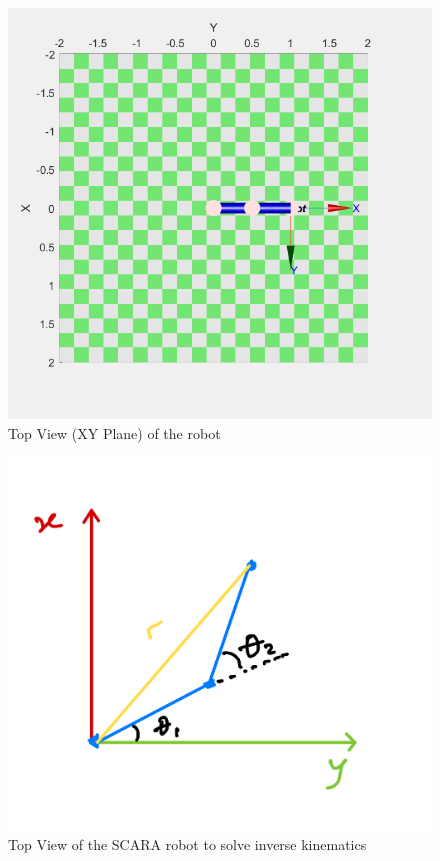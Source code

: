 \documentclass[12pt]{report}
\begin{document}
	\begin{figure}[H]
		\centering
		\includegraphics[scale=1]{run7} %
		\caption{Top View (XY Plane) of the robot}
		\label{run7} %
	\end{figure}
		\begin{figure}[H]
		\centering
		\includegraphics[scale=0.3]{20} %
		\caption{Top View of the SCARA robot to solve inverse kinematics}
		\label{run7} %
	\end{figure}
\end{document}
